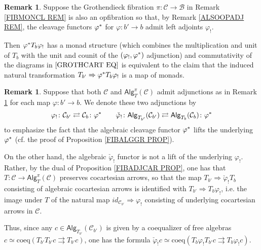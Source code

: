 \documentclass[a4paper,10pt
]{article}%
\numberwithin{equation}{section}
\numberwithin{figure}{section}
\theoremstyle{definition} %
\newtheorem{remark}[equation]{Remark}%
\newcommand{\1}{\ensuremath{\mathbbm 1}}%
\begin{document}
\begin{remark}\label{ABSPUSH REM}
	Suppose the Grothendieck fibration 
	$\pi \colon \mathcal{C} \to \mathcal{B}$
	in Remark \ref{FIBMONCL REM}
	is also an opfibration so that,
	by Remark \ref{ALSOOPADJ REM},
	the cleavage functors $\varphi^{\**}$ for 
	$\varphi \colon b' \to b$
	admit left adjoints $\varphi_!$.
	
	Then $\varphi^{\**} T_b \varphi_!$ has a monad structure
	(which combines the multiplication and unit of $T_b$ with the unit and counit of the $(\varphi_!,\varphi^{\**})$ adjunction)
	and commutativity of the diagrams in $\eqref{GROTHCART EQ}$
	is equivalent to the claim that the induced natural transformation
	$T_{b'} \Rightarrow \varphi^{\**}T_{b}\varphi_{!}$
	is a map of monads.
\end{remark}



\begin{remark}\label{ALGPUSHLL REM}
	Suppose that both $\mathcal{C}$ and $\mathsf{Alg}_T^{\pi}(\mathcal{C})$
	admit adjunctions as in 
	Remark \ref{ABSPUSH REM} for each map $\varphi \colon b' \to b$.
	We denote these two adjunctions by
	\[
	\varphi_! \colon \mathcal{C}_{b'} 
	\rightleftarrows
	\mathcal{C}_{b}\colon \varphi^{\**}
	\qquad
	\check{\varphi}_! \colon \mathsf{Alg}_{T_{b'}}(\mathcal{C}_{b'}) 
	\rightleftarrows 
	\mathsf{Alg}_{T_{b}}(\mathcal{C}_{b})\colon \varphi^{\**}
	\]
	to emphasize the fact that the algebraic cleavage functor $\varphi^{\**}$ lifts the underlying $\varphi^{\**}$ (cf. the proof of Proposition \ref{FIBALGGR PROP}).
	
	
	On the other hand, the algebraic $\check{\varphi}_!$ functor is not a lift of
	the underlying $\varphi_!$.
	Rather, by the dual of Proposition \ref{FIBADJCAR PROP},
	one has that $T \colon \mathcal{C} \to \mathsf{Alg}_T^{\pi}(\mathcal{C})$ preserves cocartesian arrows,
	so that the map $T_{b'} \Rightarrow \check{\varphi}_! T_{b}$
	consisting of algebraic cocartesian arrows
	is identified with 
	$T_{b'} \Rightarrow T_{b} \varphi_!$,
	i.e. the image under $T$
	of the natural map
	$id_{\mathcal{C}_{b'}} \Rightarrow \varphi_!$
	consisting of underlying cocartesian arrows in $\mathcal{C}$.
	
	
	Thus, since any 
	$c \in \mathsf{Alg}_{T_{b'}}(\mathcal{C}_{b'})$
	is given by a coequalizer of free algebras
	$c \simeq \mathrm{coeq}(T_{b'}T_{b'} c \rightrightarrows T_{b'} c)$,
	one has the formula
	$\check{\varphi}_! c \simeq 
	\mathrm{coeq}(T_{b}\varphi_!T_{b'} c \rightrightarrows T_{b}\varphi_! c)$.
\end{remark}
\end{document}
